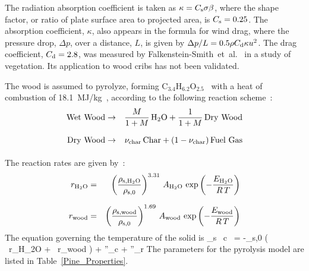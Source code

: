 The radiation absorption coefficient is taken as $\kappa=C_{\rm s} \sigma \beta$, where the shape factor, or ratio of plate surface area to projected area, is $C_{\rm s}=0.25$. The absorption coefficient, $\kappa$, also appears in the formula for wind drag, where the pressure drop, $\Delta p$, over a distance, $L$, is given by $\Delta p / L = 0.5 \rho C_{\rm d} \kappa u^2$. The drag coefficient, $C_{\rm d}=2.8$, was measured by Falkenstein-Smith~et~al.~\cite{Falkenstein-Smith:2018} in a study of vegetation. Its application to wood cribs has not been validated.

The wood is assumed to pyrolyze, forming C$_{3.4}$H$_{6.2}$O$_{2.5}$~\cite{Ritchie:1} with a heat of combustion of 18.1~MJ/kg~\cite{Hansen:2010}, according to the following reaction scheme~\cite{Janardhan:FSJ2021}:
\begin{eqnarray}
 {\rm Wet\ Wood} & \rightarrow & \frac{M}{1+M} \, {\rm H_2O} + \frac{1}{1+M} \, {\rm Dry\ Wood} \\[.1in]
 {\rm Dry\ Wood} & \rightarrow & \nu_{\rm char} \, {\rm Char} + (1-\nu_{\rm char}) \, {\rm Fuel\ Gas} \\[.1in]
\end{eqnarray}
The reaction rates are given by~\cite{Janardhan:FSJ2021}:
\begin{eqnarray}
  r_{\rm H_2O} &=& \left( \frac{\rho_{\rm s,H_2O}}{\rho_{\rm s,0}} \right)^{3.31} \, A_{\rm H_2O} \, \exp \left( -\frac{E_{\rm H_2O}}{R \, T} \right)  \\[.1in]
  r_{\rm wood} &=& \left( \frac{\rho_{\rm s,wood}}{\rho_{\rm s,0}} \right)^{1.69} \, A_{\rm wood} \, \exp \left( -\frac{E_{\rm wood}}{R \, T} \right)
\end{eqnarray}
The equation governing the temperature of the solid is
\be
\rho_{\rm s} \, c \,  = -\rho_{\rm s,0} \left( \ r_{\rm H_2O} + \ r_{\rm wood} \right) + \nabla {}''_{\rm c}  +  \nabla {}''_{\rm r}
\ee
The parameters for the pyrolysis model are listed in Table~\ref{Pine_Properties}.

